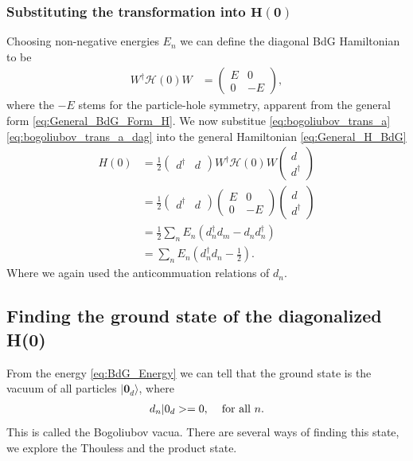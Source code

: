 \subsubsection{Substituting the transformation into $\boldsymbol{H(0)}$}
Choosing non-negative energies $E_n$ we can define the diagonal BdG Hamiltonian to be
\begin{align}
    W^\dagger \mathcal{H}(0) W &= \begin{pmatrix}
        E & 0 \\
        0 & -E
    \end{pmatrix},
\end{align}
where the $-E$ stems for the particle-hole symmetry, apparent from the general form \ref{eq:General_BdG_Form_H}. We now substitue \ref{eq:bogoliubov_trans_a} \ref{eq:bogoliubov_trans_a_dag} into the general Hamiltonian \ref{eq:General_H_BdG}
\begin{align}
    H(0)&= \frac{1}{2} \begin{pmatrix}
        d^\dagger & d
    \end{pmatrix} W^\dagger \mathcal{H}(0) W \begin{pmatrix}
        d \\
        d^\dagger
    \end{pmatrix}\\
    &= \frac{1}{2} \begin{pmatrix}
        d^\dagger & d
    \end{pmatrix} \begin{pmatrix}
        E & 0 \\
        0 & -E
    \end{pmatrix} \begin{pmatrix}
        d\\
        d^\dagger
    \end{pmatrix}\\
    &= \frac{1}{2} \sum_n E_n \left( d^\dagger_n d_m - d_n d^\dagger_n \right)\\
    &= \sum_n E_n \left(d_n^\dagger d_n - \frac{1}{2} \right) \label{eq:BdG_Energy}.
\end{align}
Where we again used the anticommuation relations of $d_n$.

\subsection{Finding the ground state of the diagonalized H(0)}
From the energy \ref{eq:BdG_Energy} we can tell that the ground state is the vacuum of all particles $|\boldsymbol{0}_d\rangle$, where
\begin{align}
    d_n |\boldsymbol{0}_d\rangle = 0, \hspace{4mm} \text{for all $n$}.
\end{align}
This is called the Bogoliubov vacua. There are several ways of finding this state, we explore the Thouless and the product state.

